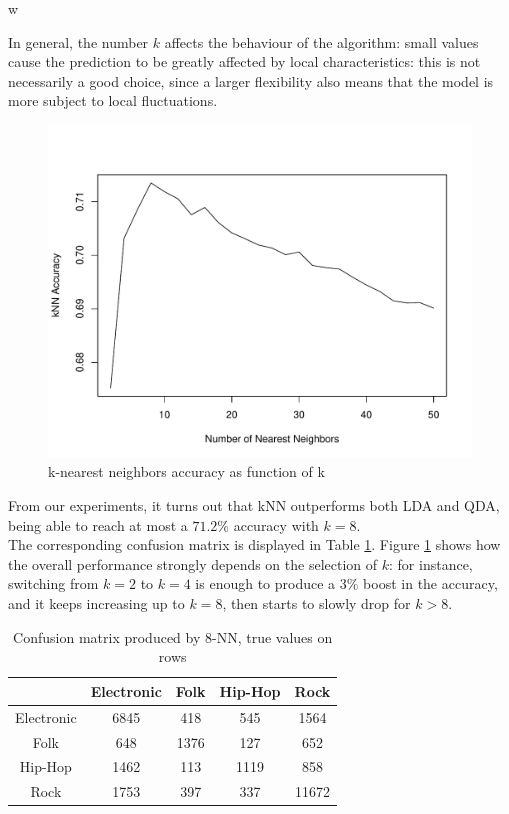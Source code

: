 w\documentclass[11pt, oneside]{article}
\begin{document}
In general, the number $k$ affects the behaviour of the algorithm: small values cause the prediction to be greatly affected by local characteristics: this is not necessarily a good choice, since a larger flexibility also means that the model is more subject to local fluctuations.

\begin{figure}[ht]
    \centering
        \includegraphics[width=\linewidth]{keynn.pdf}
        \caption{k-nearest neighbors accuracy as function of k}
        \label{fig:knn}
\end{figure}

From our experiments, it turns out that kNN outperforms both LDA and QDA, being able to reach at most a $71.2\%$ accuracy with $k=8$.\\
The corresponding confusion matrix is displayed in Table \ref{table:knnconfusion}. 
Figure \ref{fig:knn} shows how the overall performance strongly depends on the selection of $k$: for instance, switching from $k=2$ to $k=4$ is enough to produce a $3\%$ boost in the accuracy, and it keeps increasing up to $k=8$, then starts to slowly drop for $k>8$.

\begin{table}[ht]
\centering
\begin{tabular}{|c|c|c|c|c|}
    \hline
                & Electronic & Folk & Hip-Hop & Rock \\ \hline
    Electronic  &   6845    &  418  &  545  &  1564 \\ \hline
    Folk        &   648     &  1376 &  127  &  652  \\ \hline
    Hip-Hop     &   1462    &  113  &  1119 &  858  \\ \hline
    Rock        &   1753    &  397  &  337  &  11672 \\ \hline
\end{tabular}
\caption{Confusion matrix produced by 8-NN, true values on rows}
\label{table:knnconfusion}
\end{table}
\end{document}
